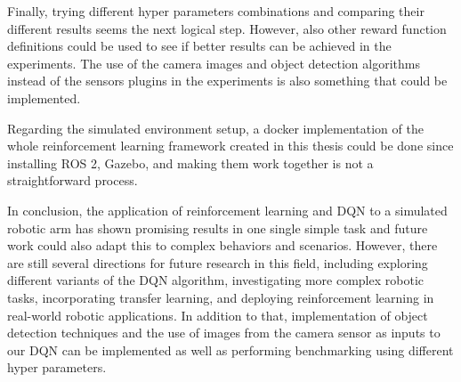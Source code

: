 \documentclass[12pt,oneside]{article}
\begin{document}
Finally, trying different hyper parameters combinations and comparing their different results seems the next logical step. However, also other reward function definitions could be used to see if better results can be achieved in the experiments. The use of the camera images and object detection algorithms instead of the sensors plugins in the experiments is also something that could be implemented.

Regarding the simulated environment setup, a docker implementation of the whole reinforcement learning framework created in this thesis could be done since installing ROS 2, Gazebo, and making them work together is not a straightforward process.

In conclusion, the application of reinforcement learning and DQN to a simulated robotic arm has shown promising results in one single simple task and future work could also adapt this to complex behaviors and scenarios. However, there are still several directions for future research in this field, including exploring different variants of the DQN algorithm, investigating more complex robotic tasks, incorporating transfer learning, and deploying reinforcement learning in real-world robotic applications. In addition to that, implementation of object detection techniques and the use of images from the camera sensor as inputs to our DQN can be implemented as well as performing benchmarking using different hyper parameters.


%
%
\end{document}
